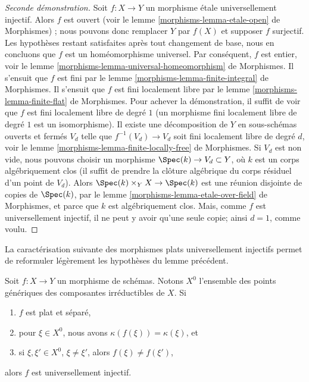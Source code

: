 \begin{proof}[Seconde démonstration]
Soit $f : X \to Y$ un morphisme \'etale universellement injectif.
Alors $f$ est ouvert (voir le lemme \ref{morphisms-lemma-etale-open} de Morphismes) ;
nous pouvons donc remplacer $Y$ par $f(X)$ et supposer $f$ surjectif.
Les hypothèses restant satisfaites après tout changement de base, nous en
concluons que $f$ est un homéomorphisme universel. Par conséquent, $f$ est
entier, voir le
lemme \ref{morphisms-lemma-universal-homeomorphism} de Morphismes.
Il s'ensuit que $f$ est fini par
le lemme \ref{morphisms-lemma-finite-integral} de Morphismes.
Il s'ensuit que $f$ est fini localement libre par
le lemme \ref{morphisms-lemma-finite-flat} de Morphismes.
Pour achever la démonstration, il suffit de voir que $f$ est fini localement
libre de degré $1$ (un morphisme fini localement libre de degré $1$
est un isomorphisme).
Il existe une décomposition de $Y$ en sous-schémas ouverts et fermés
$V_d$ telle que $f^{-1}(V_d) \to V_d$ soit fini localement libre de
degré $d$, voir le lemme \ref{morphisms-lemma-finite-locally-free} de Morphismes.
Si $V_d$ est non vide, nous pouvons choisir un morphisme
$\Spec(k) \to V_d \subset Y$, où $k$ est un corps algébriquement clos
(il suffit de prendre la clôture algébrique du corps résiduel d'un point de
$V_d$).
Alors $\Spec(k) \times_Y X \to \Spec(k)$ est une réunion disjointe de
copies de $\Spec(k)$, par le
lemme \ref{morphisms-lemma-etale-over-field} de Morphismes,
et parce que $k$ est algébriquement clos.
Mais, comme $f$ est universellement injectif, il ne peut y avoir qu'une seule
copie; ainsi $d = 1$, comme voulu.
\end{proof}

\noindent
La caractérisation suivante des morphismes plats universellement injectifs
permet de reformuler légèrement les hypothèses du lemme précédent.

\begin{lemma}
\label{lemma-flat-universally-injective}
Soit $f : X \to Y$ un morphisme de schémas. Notons $X^0$ l'ensemble
des points génériques des composantes irréductibles de $X$. Si
\begin{enumerate}
\item $f$ est plat et séparé,
\item pour $\xi \in X^0$, nous avons $\kappa(f(\xi)) = \kappa(\xi)$, et
\item si $\xi, \xi' \in X^0$, $\xi \not = \xi'$, alors
$f(\xi) \not = f(\xi')$,
\end{enumerate}
alors $f$ est universellement injectif.
\end{lemma}

